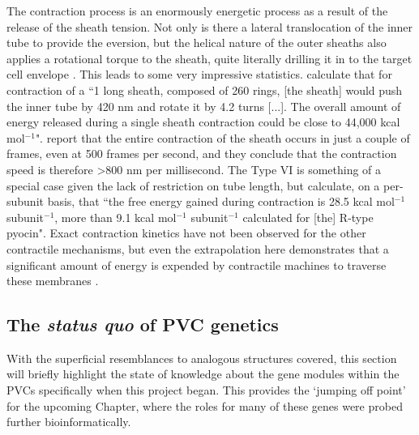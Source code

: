 The contraction process is an enormously energetic process as a result of the release of the sheath tension. Not only is there a lateral translocation of the inner tube to provide the eversion, but the helical nature of the outer sheaths also applies a rotational torque to the sheath, quite literally drilling it in to the target cell envelope \citep{Kube2015}. This leads to some very impressive statistics. \cite{Wang2017a} calculate that for contraction of a ``1 \um{} long sheath, composed of 260 rings, [the sheath] would push the inner tube by 420 nm and rotate it by 4.2 turns [...]. The overall amount of energy released during a single sheath contraction could be close to 44,000 kcal mol$^{-1}$". \cite{Vettiger2017} report that the entire contraction of the sheath occurs in just a couple of frames, even at 500 frames per second, and they conclude that the contraction speed is therefore \textgreater 800 nm per millisecond. The Type VI is  something of a special case given the lack of restriction on tube length, but \cite{Wang2017a} calculate, on a per-subunit basis, that ``the free energy gained during contraction is 28.5 kcal mol$^{-1}$ subunit$^{-1}$, more than 9.1 kcal mol$^{-1}$ subunit$^{-1}$ calculated for [the] R-type pyocin". Exact contraction kinetics have not been observed for the other contractile mechanisms, but even the extrapolation here demonstrates that a significant amount of energy is expended by contractile machines to traverse these membranes \citep{Brackmann2017}.


\subsection{The \emph{status quo} of PVC genetics}
With the superficial resemblances to analogous structures covered, this section will briefly highlight the state of knowledge about the gene modules within the PVCs specifically when this project began. This provides the `jumping off point' for the upcoming Chapter, where the roles for many of these genes were probed further bioinformatically.

